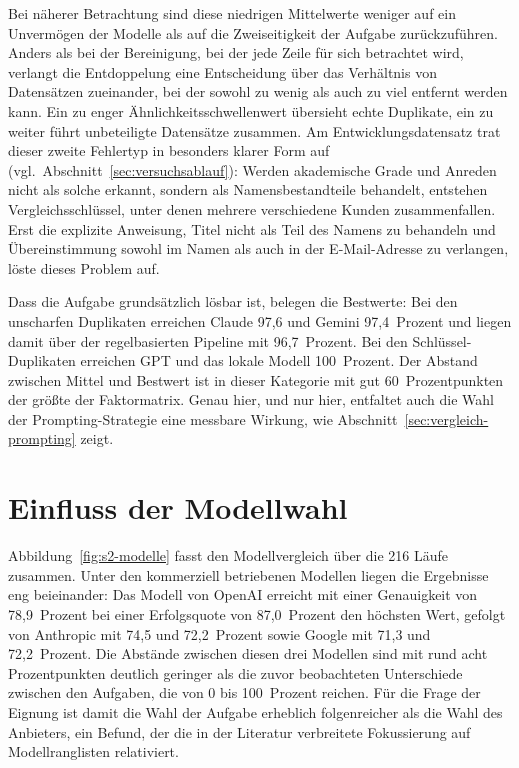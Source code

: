 Bei näherer Betrachtung sind diese niedrigen Mittelwerte weniger auf ein Unvermögen der Modelle als auf die Zweiseitigkeit der Aufgabe zurückzuführen. Anders als bei der Bereinigung, bei der jede Zeile für sich betrachtet wird, verlangt die Entdoppelung eine Entscheidung über das Verhältnis von Datensätzen zueinander, bei der sowohl zu wenig als auch zu viel entfernt werden kann. Ein zu enger Ähnlichkeitsschwellenwert übersieht echte Duplikate, ein zu weiter führt unbeteiligte Datensätze zusammen. Am Entwicklungsdatensatz trat dieser zweite Fehlertyp in besonders klarer Form auf (vgl.\ Abschnitt~\ref{sec:versuchsablauf}): Werden akademische Grade und Anreden nicht als solche erkannt, sondern als Namensbestandteile behandelt, entstehen Vergleichsschlüssel, unter denen mehrere verschiedene Kunden zusammenfallen. Erst die explizite Anweisung, Titel nicht als Teil des Namens zu behandeln und Übereinstimmung sowohl im Namen als auch in der E-Mail-Adresse zu verlangen, löste dieses Problem auf.

Dass die Aufgabe grundsätzlich lösbar ist, belegen die Bestwerte: Bei den unscharfen Duplikaten erreichen Claude 97,6 und Gemini 97,4~Prozent und liegen damit über der regelbasierten Pipeline mit 96,7~Prozent. Bei den Schlüssel-Duplikaten erreichen GPT und das lokale Modell 100~Prozent. Der Abstand zwischen Mittel und Bestwert ist in dieser Kategorie mit gut 60~Prozentpunkten der größte der Faktormatrix. Genau hier, und nur hier, entfaltet auch die Wahl der Prompting-Strategie eine messbare Wirkung, wie Abschnitt~\ref{sec:vergleich-prompting} zeigt.

\section{Einfluss der Modellwahl}
\label{sec:vergleich-modelle}

Abbildung~\ref{fig:s2-modelle} fasst den Modellvergleich über die 216 Läufe zusammen. Unter den kommerziell betriebenen Modellen liegen die Ergebnisse eng beieinander: Das Modell von OpenAI erreicht mit einer Genauigkeit von 78,9~Prozent bei einer Erfolgsquote von 87,0~Prozent den höchsten Wert, gefolgt von Anthropic mit 74,5 und 72,2~Prozent sowie Google mit 71,3 und 72,2~Prozent. Die Abstände zwischen diesen drei Modellen sind mit rund acht Prozentpunkten deutlich geringer als die zuvor beobachteten Unterschiede zwischen den Aufgaben, die von 0 bis 100~Prozent reichen. Für die Frage der Eignung ist damit die Wahl der Aufgabe erheblich folgenreicher als die Wahl des Anbieters, ein Befund, der die in der Literatur verbreitete Fokussierung auf Modellranglisten relativiert.

